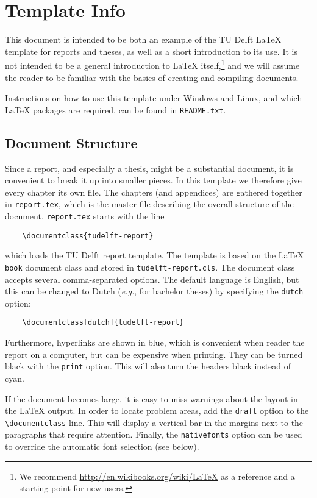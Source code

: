 \chapter{Template Info}

This document is intended to be both an example of the TU Delft \LaTeX{} template for reports and theses, as well as a short introduction to its use. It is not intended to be a general introduction to \LaTeX{} itself,\footnote{We recommend \url{http://en.wikibooks.org/wiki/LaTeX} as a reference and a starting point for new users.} and we will assume the reader to be familiar with the basics of creating and compiling documents.

Instructions on how to use this template under Windows and Linux, and which \LaTeX{} packages are required, can be found in \texttt{README.txt}.

\section{Document Structure}

Since a report, and especially a thesis, might be a substantial document, it is convenient to break it up into smaller pieces. In this template we therefore give every chapter its own file. The chapters (and appendices) are gathered together in \texttt{report.tex}, which is the master file describing the overall structure of the document. \texttt{report.tex} starts with the line
\begin{verbatim}
    \documentclass{tudelft-report}
\end{verbatim}
which loads the TU Delft report template. The template is based on the \LaTeX{} \texttt{book} document class and stored in \texttt{tudelft-report.cls}. The document class accepts several comma-separated options. The default language is English, but this can be changed to Dutch (\emph{e.g.}, for bachelor theses) by specifying the \texttt{dutch} option:
\begin{verbatim}
    \documentclass[dutch]{tudelft-report}
\end{verbatim}
Furthermore, hyperlinks are shown in blue, which is convenient when reader the report on a computer, but can be expensive when printing. They can be turned black with the \texttt{print} option. This will also turn the headers black instead of cyan.

If the document becomes large, it is easy to miss warnings about the layout in the \LaTeX{} output. In order to locate problem areas, add the \texttt{draft} option to the \verb|\documentclass| line. This will display a vertical bar in the margins next to the paragraphs that require attention. Finally, the \texttt{nativefonts} option can be used to override the automatic font selection (see below).

